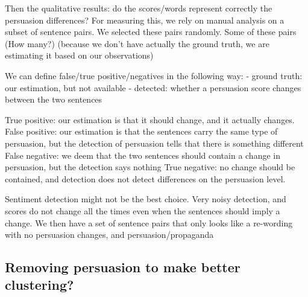 Then the qualitative results: do the scores/words represent correctly the persuasion differences? For measuring this, we rely on manual analysis on a subset of sentence pairs. We selected these pairs randomly. Some of these pairs (How many?)
(because we don't have actually the ground truth, we are estimating it based on our observations)

We can define false/true positive/negatives in the following way:
- ground truth: our estimation, but not available
- detected: whether a persuasion score changes between the two sentences

True positive: our estimation is that it should change, and it actually changes.
False positive: our estimation is that the sentences carry the same type of persuasion, but the detection of persuasion tells that there is something different
False negative: we deem that the two sentences should contain a change in persuasion, but the detection says nothing
True negative: no change should be contained, and detection does not detect differences on the persuasion level.

Sentiment detection might not be the best choice. Very noisy detection, and scores do not change all the times even when the sentences should imply a change.
We then have a set of sentence pairs that only looks like a re-wording with no persuasion changes, and persuasion/propaganda 




\subsection{\statusorange Removing persuasion to make better clustering?}

